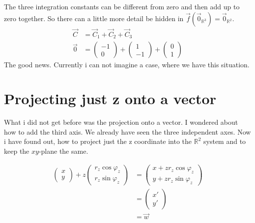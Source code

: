 \documentclass[a4paper]{article}
\begin{document}
The three integration constants can be different from zero and then add up to zero together. So there can a little more detail be hidden in $\vec{f}(\vec{0}_{\mathbb{R}^{3}}) = \vec{0}_{\mathbb{R}^{2}}$.\\
\begin{displaymath}
\begin{align}
\vec{C} &= \vec{C}_{1} + \vec{C}_{2} + \vec{C}_{3} \\
\vec{0} &= \begin{pmatrix}-1\\0\end{pmatrix}+\begin{pmatrix}1\\-1\end{pmatrix}+\begin{pmatrix}0\\1\end{pmatrix}
\end{align}
\end{displaymath}
The good news. Currently i can not imagine a case, where we have this situation.\\


\section{Projecting just z onto a vector}


\label{projecting_just_z}
What i did not get before was the projection onto a vector. I wondered about how to add the third axis. We already have seen the three independent axes. Now i have found out, how to project just the z coordinate into the $\mathbb{R}^{2}$ system and to keep the $xy$-plane the same. 

\begin{displaymath}
\begin{align}
\begin{pmatrix}x\\y\end{pmatrix} + z\begin{pmatrix}r_z\cos\varphi_z\\r_z\sin\varphi_z\end{pmatrix} &= \begin{pmatrix}x+zr_{z}\cos\varphi_z\\y+zr_{z}\sin\varphi_z\end{pmatrix}\\ &= \begin{pmatrix}x'\\y'\end{pmatrix}\\ &= \vec{w}
\end{align}
\end{displaymath}
\end{document}
